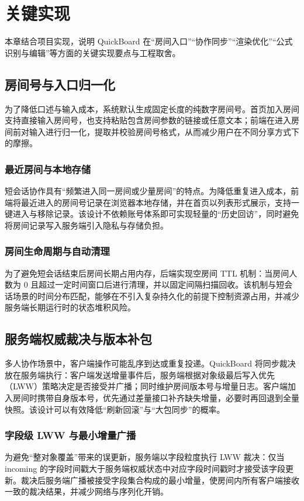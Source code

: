 \chapter{关键实现}\label{chap:impl}

本章结合项目实现，说明 QuickBoard 在“房间入口”“协作同步”“渲染优化”“公式识别与编辑”等方面的关键实现要点与工程取舍。

\section{房间号与入口归一化}
为了降低口述与输入成本，系统默认生成固定长度的纯数字房间号。首页加入房间支持直接输入房间号，也支持粘贴包含房间参数的链接或任意文本；前端在进入房间前对输入进行归一化，提取并校验房间号格式，从而减少用户在不同分享方式下的摩擦。

\subsection{最近房间与本地存储}
短会话协作具有“频繁进入同一房间或少量房间”的特点。为降低重复进入成本，前端将最近进入的房间号记录在浏览器本地存储，并在首页以列表形式展示，支持一键进入与移除记录。该设计不依赖账号体系即可实现轻量的“历史回访”，同时避免将房间记录写入服务端引入隐私与存储负担。

\subsection{房间生命周期与自动清理}
为了避免短会话结束后房间长期占用内存，后端实现空房间 TTL 机制：当房间人数为 0 且超过一定时间窗口后进行清理，并以固定间隔扫描回收。该机制与短会话场景的时间分布匹配，能够在不引入复杂持久化的前提下控制资源占用，并减少服务端长期运行时的状态堆积风险。

\section{服务端权威裁决与版本补包}
多人协作场景中，客户端操作可能乱序到达或重复投递。QuickBoard 将同步裁决放在服务端执行：客户端发送增量事件后，服务端根据对象级最后写入优先（LWW）策略决定是否接受并广播；同时维护房间版本号与增量日志。客户端加入房间时携带自身版本号，优先通过差量接口补齐缺失增量，必要时再回退到全量快照。该设计可以有效降低“刷新回滚”与“大包同步”的概率。

\subsection{字段级 LWW 与最小增量广播}
为避免“整对象覆盖”带来的误更新，服务端以字段粒度执行 LWW 裁决：仅当 incoming 的字段时间戳大于服务端权威状态中对应字段时间戳时才接受该字段更新。裁决后服务端广播被接受字段集合构成的最小增量，使房间内所有客户端接收一致的裁决结果，并减少网络与序列化开销。

